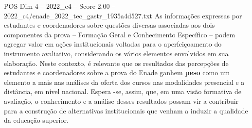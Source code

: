 \begin{textsample}{POS Dim 4 – 2022\_c4 – Score 2.00 – 2022\_c4/enade\_2022\_tec\_gastr\_1935a4d527.txt}
As informações expressas por estudantes e coordenadores sobre questões diversas associadas aos dois componentes da prova – Formação Geral e Conhecimento Específico – podem agregar valor em ações institucionais voltadas para o aperfeiçoamento do instrumento avaliativo, considerando os vários elementos envolvidos em sua elaboração.
Neste contexto, é relevante que os resultados das percepções de estudantes e coordenadores sobre a prova do Enade ganhem \textbf{peso} como um elemento a mais nas análises da oferta dos cursos nas modalidades presencial e a distância, em nível nacional.
Espera -se, assim, que, em uma visão formativa de avaliação, o conhecimento e a análise desses resultados possam vir a contribuir para a construção de alternativas institucionais que venham a induzir a qualidade da educação superior.

\end{textsample}

